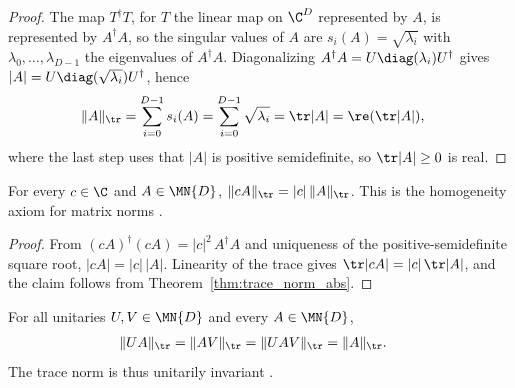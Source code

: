 \begin{proof}\leanok
    The map $T^\dagger T$, for $T$ the linear map on $\C^D$ represented by
    $A$, is represented by $A^\dagger A$, so the singular values of $A$ are
    $s_i(A)=\sqrt{\lambda_i}$ with $\lambda_0,\ldots,\lambda_{D-1}$ the
    eigenvalues of $A^\dagger A$. Diagonalizing
    $A^\dagger A=U\diag(\lambda_i)U^\dagger$ gives
    $\lvert A\rvert=U\diag(\sqrt{\lambda_i})U^\dagger$, hence
    \begin{align}
        \lVert A\rVert_{\tr}
         & =\sum_{i=0}^{D-1}s_i(A)
        =\sum_{i=0}^{D-1}\sqrt{\lambda_i}
        =\tr\lvert A\rvert
        =\re(\tr\lvert A\rvert),
        \notag
    \end{align}
    where the last step uses that $\lvert A\rvert$ is positive semidefinite,
    so $\tr\lvert A\rvert\geq0$ is real.
\end{proof}

\begin{theorem}
    \label{thm:trace_norm_homogeneous}
    \leanok
    For every $c\in\C$ and $A\in\MN{D}$,
    $\lVert cA\rVert_{\tr}
        =\lvert c\rvert\,\lVert A\rVert_{\tr}$.
    This is the homogeneity axiom for matrix norms
    \cite[Chapter~8, Section~8.1]{Wolf2012Quantum}.
\end{theorem}

\begin{proof}\leanok
    From $(cA)^\dagger(cA)=\lvert c\rvert^2\,A^\dagger A$ and uniqueness of
    the positive-semidefinite square root,
    $\lvert cA\rvert=\lvert c\rvert\,\lvert A\rvert$. Linearity of the trace
    gives
    $\tr\lvert cA\rvert
        =\lvert c\rvert\,\tr\lvert A\rvert$, and the claim follows
    from Theorem~\ref{thm:trace_norm_abs}.
\end{proof}

\begin{theorem}
    \label{thm:trace_norm_unitary_invariance}
    \leanok
    For all unitaries $U,V\in\MN{D}$ and every $A\in\MN{D}$,
    \begin{align}
        \lVert UA\rVert_{\tr}
         & =\lVert AV\rVert_{\tr}
        =\lVert UAV\rVert_{\tr}
        =\lVert A\rVert_{\tr}.
        \notag
    \end{align}
    The trace norm is thus unitarily invariant
    \cite[Chapter~8, Section~8.1]{Wolf2012Quantum}.
\end{theorem}

